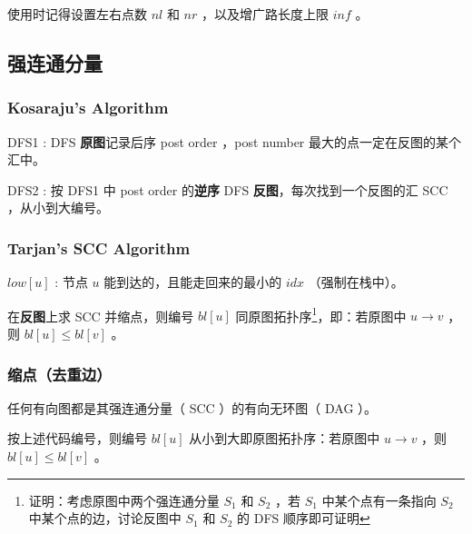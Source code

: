 使用时记得设置左右点数 $nl$ 和 $nr$ ，以及增广路长度上限 $inf$ 。

\newpage



\newpage

\subsection{强连通分量}

\subsubsection{Kosaraju's Algorithm}

\noindent 
DFS1 : DFS \textbf{原图}记录后序 post order ，post number 最大的点一定在反图的某个汇中。

\noindent 
DFS2 : 按 DFS1 中 post order 的\textbf{逆序} DFS \textbf{反图}，每次找到一个反图的汇 SCC ，从小到大编号。



\subsubsection{Tarjan's SCC Algorithm}

\noindent 
$low[u]$ : 节点 $u$ 能到达的，且能走回来的最小的 $idx$ （强制在栈中）。

\noindent 
在\textbf{反图}上求 SCC 并缩点，则编号 $bl[u]$ 同原图拓扑序\footnote{证明：考虑原图中两个强连通分量 $S_1$ 和 $S_2$ ，若 $S_1$ 中某个点有一条指向 $S_2$ 中某个点的边，讨论反图中 $S_1$ 和 $S_2$ 的 DFS 顺序即可证明}，即：若原图中 $u\to v$ ，则 $bl[u] \le bl[v]$ 。



\newpage

\subsubsection{缩点（去重边）}

任何有向图都是其强连通分量（ SCC ）的有向无环图（ DAG ）。

按上述代码编号，则编号 $bl[u]$ 从小到大即原图拓扑序：若原图中 $u\to v$ ，则 $bl[u] \le bl[v]$ 。



\vspace{-0.4cm}

